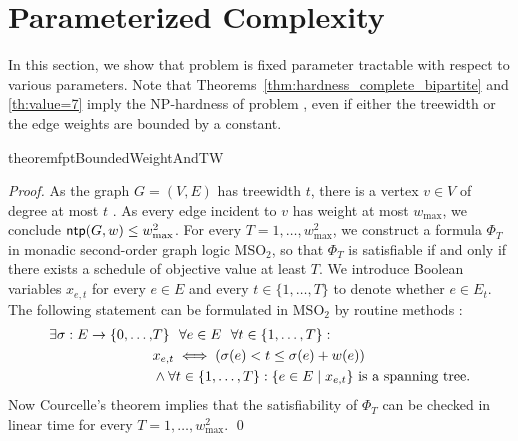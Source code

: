 \section{Parameterized Complexity}
\label{sec:parameterized}
In this section, we show that problem {\xxxNTP} is fixed parameter tractable with 
respect to various parameters. 
Note that Theorems~\ref{thm:hardness_complete_bipartite} and \ref{th:value=7} imply the NP-hardness 
of problem {\xxxNTP}, even if either the treewidth or the edge weights are bounded by a constant. 

\begin{restatable}{theorem}{fptBoundedWeightAndTW}
\label{th:fpt_weights_and_tw_bounded}
\end{restatable}
\begin{proof}
As the graph $G=(V,E)$ has treewidth $t$, there is a vertex $v\in V$ of degree at most $t$ .
As every edge incident to $v$ has weight at most $w_{\max}$, we conclude $\operatorname{\textsf{ntp}}(G,w)\le w_{\max}^2$. 
For every $T=1,\ldots,w_{\max}^2$, we construct a formula $\Phi_T$ in monadic second-order 
graph logic $\text{MSO}_2$, so that $\Phi_T$ is satisfiable if and only if there exists a schedule 
of objective value at least $T$. 
We introduce Boolean variables $x_{e,t}$ for every $e\in E$ and every $t\in \{1,\dots,T\}$
to denote whether $e\in E_t$. 
The following statement can be formulated in $\text{MSO}_2$ by routine methods :
\begin{align*}
\exists \sigma: E\to\{0,\ldots,&T\} ~~\forall e\in E ~~\forall t\in\{1,\ldots,T\}: \\
& x_{e,t} \iff \left(\sigma(e) < t \leq \sigma(e) + w(e)\right)\\
& \land \forall t\in\{1,\ldots,T\}: \{ e\in E \mid x_{e,t} \} \text{ is a spanning tree.}
\end{align*}
Now Courcelle's theorem \cite{courcelle1990monadic} implies that the satisfiability of $\Phi_T$ 
can be checked in linear time for every $T=1,\ldots,w_{\max}^2$.
\qed
\end{proof}

